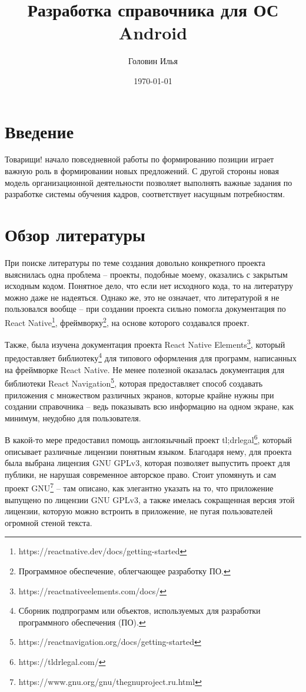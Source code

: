 \documentclass[a4paper,12pt]{article}
\author{Головин Илья}
\title{Разработка справочника для ОС Android}
\date{\today}
\begin{document}
\maketitle
\newpage
\tableofcontents
\newpage

\section{Введение}
Товарищи! начало повседневной работы по формированию позиции играет важную роль в формировании новых предложений. С другой стороны новая модель организационной деятельности позволяет выполнять важные задания по разработке системы обучения кадров, соответствует насущным потребностям.
\newpage

\section{Обзор литературы}
При поиске литературы по теме создания довольно конкретного проекта выяснилась одна проблема -- проекты, подобные моему, оказались с закрытым исходным кодом. Понятное дело, что если нет исходного кода, то на литературу можно даже не надеяться. Однако же, это не означает, что литературой я не пользовался вообще -- при создании проекта сильно помогла документация по React Native\footnote{https://reactnative.dev/docs/getting-started}, фреймворку\footnote{Программное обеспечение, облегчающее разработку ПО.}, на основе которого создавался проект. \par
Также, была изучена документация проекта React Native Elements\footnote{https://reactnativeelements.com/docs/}, который предоставляет библиотеку\footnote{Сборник подпрограмм или объектов, используемых для разработки программного обеспечения (ПО).} для типового оформления для программ, написанных на фреймворке React Native. Не менее полезной оказалась документация для библиотеки React Navigation\footnote{https://reactnavigation.org/docs/getting-started}, которая предоставляет способ создавать приложения с множеством различных экранов, которые крайне нужны при создании справочника -- ведь показывать всю информацию на одном экране, как минимум, неудобно для пользователя. \par
В какой-то мере предоставил помощь англоязычный проект tl;drlegal\footnote{https://tldrlegal.com/}, который описывает различные лицензии понятным языком. Благодаря нему, для проекта была выбрана лицензия GNU GPLv3, которая позволяет выпустить проект для публики, не нарушая современное авторское право.
Стоит упомянуть и сам проект GNU\footnote{https://www.gnu.org/gnu/thegnuproject.ru.html} -- там описано, как элегантно указать на то, что приложение выпущено по лицензии GNU GPLv3, а также имелась сокращенная версия этой лицензии, которую можно встроить в приложение, не пугая пользователей огромной стеной текста. 
\end{document}
